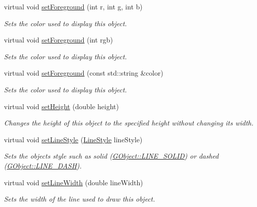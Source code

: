 \begin{DoxyCompactItemize}
virtual void \mbox{\hyperlink{classsgl_1_1GObject_ad18e8fab1e02a4e9b75c6730212558eb}{set\+Foreground}} (int r, int g, int b)
\begin{DoxyCompactList}\small\item\em Sets the color used to display this object. \end{DoxyCompactList}\item 
virtual void \mbox{\hyperlink{classsgl_1_1GObject_a9eb856b5ff83a19df3831a31f15f4563}{set\+Foreground}} (int rgb)
\begin{DoxyCompactList}\small\item\em Sets the color used to display this object. \end{DoxyCompactList}\item 
virtual void \mbox{\hyperlink{classsgl_1_1GObject_af59209aeadea6dfc6d97a2d8531f50e1}{set\+Foreground}} (const std\+::string \&color)
\begin{DoxyCompactList}\small\item\em Sets the color used to display this object. \end{DoxyCompactList}\item 
virtual void \mbox{\hyperlink{classsgl_1_1GObject_a9e280bfc4544dfaf8e4376c4e1a74357}{set\+Height}} (double height)
\begin{DoxyCompactList}\small\item\em Changes the height of this object to the specified height without changing its width. \end{DoxyCompactList}\item 
virtual void \mbox{\hyperlink{classsgl_1_1GObject_add11575087eb94f1a71faa3f826c6341}{set\+Line\+Style}} (\mbox{\hyperlink{classsgl_1_1GObject_a86e0f5648542856159bb40775c854aa7}{Line\+Style}} line\+Style)
\begin{DoxyCompactList}\small\item\em Sets the object\textquotesingle{}s style such as solid (\mbox{\hyperlink{classsgl_1_1GObject_a86e0f5648542856159bb40775c854aa7a700c78bc2cd76acaab26651bf7b4941f}{G\+Object\+::\+L\+I\+N\+E\+\_\+\+S\+O\+L\+ID}}) or dashed (\mbox{\hyperlink{classsgl_1_1GObject_a86e0f5648542856159bb40775c854aa7a9ccba0845f785d81d07b333ae1aad84e}{G\+Object\+::\+L\+I\+N\+E\+\_\+\+D\+A\+SH}}). \end{DoxyCompactList}\item 
virtual void \mbox{\hyperlink{classsgl_1_1GObject_afd6a47c6ea6a1f85ca05a65ba3ff3477}{set\+Line\+Width}} (double line\+Width)
\begin{DoxyCompactList}\small\item\em Sets the width of the line used to draw this object. \end{DoxyCompactList}\item 

\end{DoxyCompactItemize}
